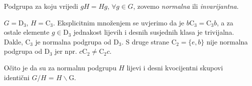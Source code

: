 \begin{definicija}
Podgrupa za koju vrijedi $gH=Hg$, $\forall g\in G$, zovemo
\emph{normalna} ili \emph{invarijantna}.
\label{tm:normalnapodgrupa}
\end{definicija}

\begin{primjer}[$\mathrm{D}_3$]
    $G=\mathrm{D}_3$, $H=\mathrm{C}_3$. Eksplicitnim množenjem se uvjerimo da
    je $b\mathrm{C}_3 = \mathrm{C}_3 b$, a za ostale elemente $g\in \mathrm{D}_3$ jednakost
    lijevih i desnih susjednih klasa je trivijalna.
    Dakle, $\mathrm{C}_3$  je normalna podgrupa od $\mathrm{D}_3$. S druge strane
    $\mathrm{C}_2 = \{e, b\}$ nije normalna podgrupa od $\mathrm{D}_3$
    jer npr. $c \mathrm{C}_2 \neq \mathrm{C}_2 c$.
\end{primjer}

Očito je da su za normalnu podgrupu $H$ lijevi i desni kvocijentni skupovi
identični  $G/H$ = $H\backslash$G.

